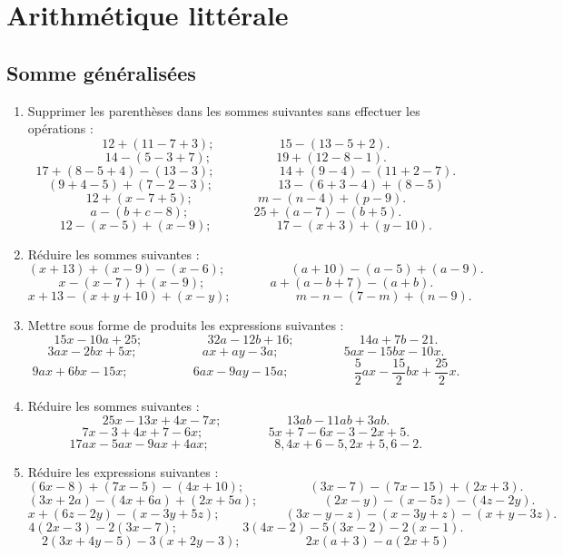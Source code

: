 \documentclass[12 pt]{extarticle}
\theoremstyle{plain}
\begin{document}
 \section{Arithmétique littérale}
 
 \subsection{Somme généralisées}
 \begin{enumerate}
 \item Supprimer les parenthèses dans les sommes suivantes sans effectuer les opérations : 
 \[ 12 + (11 - 7 + 3) ; \phantom{meowmeow} 15 - (13 - 5 + 2).\]
 \[ 14 - ( 5 - 3 + 7); \phantom{meowmeow} 19 + (12 - 8 - 1). \]
 \[ 17 + ( 8 - 5 + 4) - (13 -3); \phantom{meowmeow} 14 + (9 - 4) - (11 + 2 - 7).\]
 \[(9 + 4 - 5) + (7 - 2 - 3); \phantom{meowmeow} 13 - (6 + 3 - 4) + ( 8 - 5)\]
 \[ 12 + ( x - 7 + 5); \phantom{meowmeow} m - (n - 4) + (p - 9).\]
 \[ a - (b + c - 8); \phantom{meowmeow} 25 + (a - 7)  - (b + 5).\]
 \[ 12 - (x - 5) + (x - 9); \phantom{meowmeow} 17 - (x + 3) + (y - 10).\]
 \item Réduire les sommes suivantes : 
 \[ (x + 13) + (x - 9) - (x - 6); \phantom{meowmeow} 
 (a + 10) - (a - 5) + (a - 9). \]
 \[ x - (x - 7)  + (x - 9); \phantom{meowmeow} 
 a + (a - b + 7) - (a + b). \]
 \[ x + 13 - (x + y + 10) + (x - y); \phantom{meowmeow} 
 m - n - (7 - m) + (n - 9).\]
 \item Mettre sous forme de produits les expressions suivantes : 
\[ 15 x -10 a + 25; \phantom{meowmeow} 32 a - 12 b + 16; \phantom{meowmeow}
14a + 7b - 21.\]
\[ 3ax-2bx + 5x; \phantom{meowmeow} ax + ay - 3a; \phantom{meowmeow}
5ax - 15 bx - 10x.\]
\[ 9ax + 6bx - 15x; \phantom{meowmeow} 6ax - 9ay - 15 a; \phantom{meowmeow}
\frac52 ax - \frac{15}2bx + \frac{25}2 x. \]
\item Réduire les sommes suivantes : 
\[25x - 13 x + 4x - 7x; \phantom{meowmeow} 13 ab - 11 ab + 3ab. \]
\[ 7x - 3 + 4x +7 - 6x; \phantom{meowmeow} 5x + 7 - 6x - 3 - 2x + 5.\]
\[ 17 ax - 5ax - 9ax + 4ax ; \phantom{meowmeow} 8,4x + 6 - 5,2x + 5,6 - 2.\]
\item Réduire les expressions suivantes : 
\[ (6x - 8) + (7x - 5) - (4x + 10); \phantom{meowmeow} (3x -7) - (7x - 15)
+ (2x + 3).\]
\[ (3x + 2a) - (4x + 6a) + (2x + 5a); \phantom{meowmeow} (2x - y) - (x - 5z)
- (4z - 2y). \]
\[ x + (6z - 2y) - (x - 3y + 5z); \phantom{meowmeow} (3x - y - z) - (x - 3y + z) - (x + y - 3z).\]
\[ 4(2x - 3) - 2(3x - 7); \phantom{meowmeow} 3(4x - 2)- 5(3x - 2) - 2(x -1).\]
\[2(3x + 4y - 5) - 3(x + 2y - 3) ; \phantom{meowmeow} 2x(a + 3) - a(2x +  5)
\]
\end{enumerate}
\end{document}
